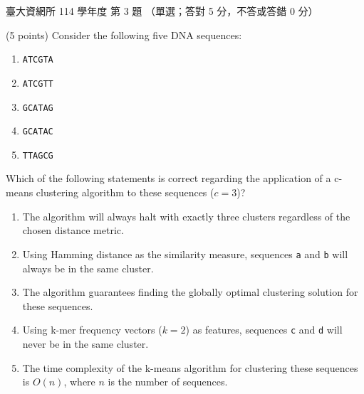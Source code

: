 \begin{pastexam}[label={px:ntu-114-dsa-03}]{臺大資網所 114 學年度 第 3 題}
（單選；答對 5 分，不答或答錯 0 分）

(5 points) Consider the following five DNA sequences:
\begin{enumerate}[label=\texttt{\alph*)}]
\item \texttt{ATCGTA}
\item \texttt{ATCGTT}
\item \texttt{GCATAG}
\item \texttt{GCATAC}
\item \texttt{TTAGCG}
\end{enumerate}
Which of the following statements is correct regarding the application of a c-means clustering algorithm to
these sequences ($c=3$)?
\begin{enumerate}[label=(\Alph*)]
\item The algorithm will always halt with exactly three clusters regardless of the chosen distance metric.
\item Using Hamming distance as the similarity measure, sequences \texttt{a} and \texttt{b} will always be in the
same cluster.
\item The algorithm guarantees finding the globally optimal clustering solution for these sequences.
\item Using k-mer frequency vectors ($k=2$) as features, sequences \texttt{c} and \texttt{d} will never be in the
same cluster.
\item The time complexity of the k-means algorithm for clustering these sequences is $O(n)$, where $n$ is the
number of sequences.
\end{enumerate}
\end{pastexam}

